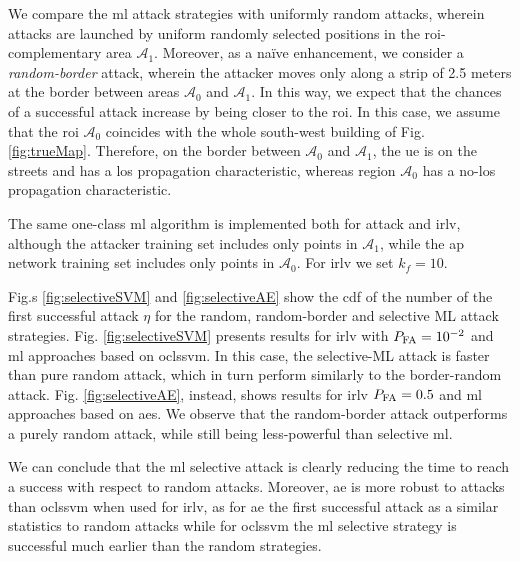 \documentclass[draftcls,onecolumn,12pt]{IEEEtran}
\begin{document}

We compare the \ac{ml} attack strategies with uniformly random attacks, wherein attacks are launched by uniform randomly selected positions in the \ac{roi}-complementary area $\mathcal{A}_1$.  Moreover, as a na\"ive enhancement, we consider a \emph{random-border} attack, wherein the attacker moves only along a strip of 2.5 meters at the border between areas $\mathcal{A}_0$ and $\mathcal A_1$. In this way, we expect that the chances of a successful attack increase by being closer to the \ac{roi}. In this case, we assume that the \ac{roi} $\mathcal A_0$ coincides with the whole south-west building of Fig. \ref{fig:trueMap}. Therefore, on the border between $\mathcal A_0$ and $\mathcal A_1$, the \ac{ue} is on the streets and has a \ac{los} propagation characteristic, whereas region $\mathcal A_0$ has a no-\ac{los} propagation characteristic. 

The same one-class \ac{ml} algorithm is implemented both for attack and \ac{irlv}, although the attacker training set includes only points in $\mathcal A_1$, while the \ac{ap} network training set includes only  points in $\mathcal A_0$. For  \ac{irlv}  we set $k_f=10$.

Fig.s \ref{fig:selectiveSVM} and \ref{fig:selectiveAE} show the \ac{cdf} of the number of the first successful attack $\eta$ for the random, random-border and selective ML attack strategies. Fig. \ref{fig:selectiveSVM} presents results for \ac{irlv} with $P_{\rm FA}=10^{-2}$ and \ac{ml} approaches based on \ac{oclssvm}. In this case, the selective-ML attack is faster than pure random attack, which in turn perform similarly to the border-random  attack.  Fig. \ref{fig:selectiveAE}, instead, shows results for  \ac{irlv} $P_{\rm FA} =0.5$ and \ac{ml} approaches based on \acp{ae}. We observe that the random-border attack outperforms a purely random attack, while still being less-powerful than selective \ac{ml}. 

We can conclude that the \ac{ml} selective attack is clearly reducing the time to reach a success with respect to random attacks. Moreover, \ac{ae} is more robust to attacks than \ac{oclssvm} when used for \ac{irlv}, as for \ac{ae} the first successful attack as a similar statistics to random attacks while for \ac{oclssvm} the \ac{ml} selective strategy is  successful much earlier than the random strategies. 
\end{document}
